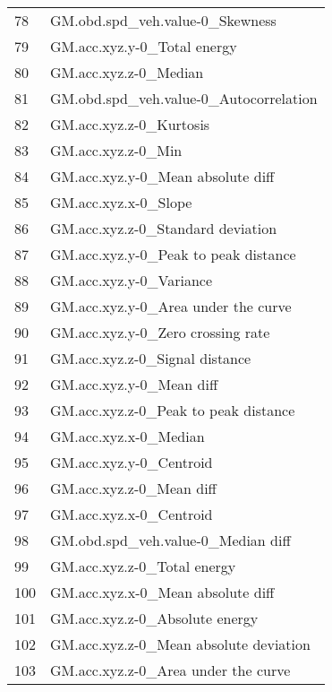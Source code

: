 \begin{tabular}{ll}
78  &                   GM.obd.spd\_veh.value-0\_Skewness \\
79  &                       GM.acc.xyz.y-0\_Total energy \\
80  &                             GM.acc.xyz.z-0\_Median \\
81  &            GM.obd.spd\_veh.value-0\_Autocorrelation \\
82  &                           GM.acc.xyz.z-0\_Kurtosis \\
83  &                                GM.acc.xyz.z-0\_Min \\
84  &                 GM.acc.xyz.y-0\_Mean absolute diff \\
85  &                              GM.acc.xyz.x-0\_Slope \\
86  &                 GM.acc.xyz.z-0\_Standard deviation \\
87  &              GM.acc.xyz.y-0\_Peak to peak distance \\
88  &                           GM.acc.xyz.y-0\_Variance \\
89  &               GM.acc.xyz.y-0\_Area under the curve \\
90  &                 GM.acc.xyz.y-0\_Zero crossing rate \\
91  &                    GM.acc.xyz.z-0\_Signal distance \\
92  &                          GM.acc.xyz.y-0\_Mean diff \\
93  &              GM.acc.xyz.z-0\_Peak to peak distance \\
94  &                             GM.acc.xyz.x-0\_Median \\
95  &                           GM.acc.xyz.y-0\_Centroid \\
96  &                          GM.acc.xyz.z-0\_Mean diff \\
97  &                           GM.acc.xyz.x-0\_Centroid \\
98  &                GM.obd.spd\_veh.value-0\_Median diff \\
99  &                       GM.acc.xyz.z-0\_Total energy \\
100 &                 GM.acc.xyz.x-0\_Mean absolute diff \\
101 &                    GM.acc.xyz.z-0\_Absolute energy \\
102 &            GM.acc.xyz.z-0\_Mean absolute deviation \\
103 &               GM.acc.xyz.z-0\_Area under the curve \\

\end{tabular}
